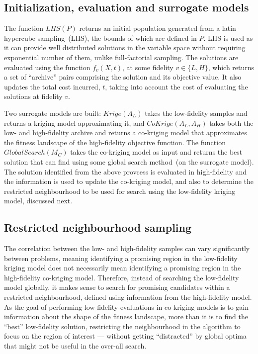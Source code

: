 \subsection{Initialization, evaluation and surrogate models}
The function $LHS(P)$ returns an initial population generated from a latin hypercube sampling~(LHS), the bounds of which are defined in $P$. LHS is used as it can provide well distributed solutions in the variable space without requiring exponential number of them, unlike full-factorial sampling. The solutions are evaluated using the function $f_v(X,t)$, at some fidelity $v\in \{L,H\}$, which returns a set of ``archive'' pairs comprising the solution and its objective value. It also updates the total cost incurred, $t$, taking into account the cost of evaluating the solutions at fidelity $v$. 

Two surrogate models are built: $Krige(A_L)$ takes the low-fidelity samples and returns a kriging model approximating it, and $CoKrige(A_L,A_H)$ takes both the low- and high-fidelity archive and returns a co-kriging model that approximates the fitness landscape of the high-fidelity objective function. The function $GlobalSearch(M_C)$ takes the co-kriging model as input and returns the best solution that can find using some global search method~(on the surrogate model). The solution identified from the above provcess is evaluated in high-fidelity and the information is used to update the co-kriging model, and also to determine the restricted neighbourhood to be used for search using the low-fidelity kriging model, discussed next.

\subsection{Restricted neighbourhood sampling}\label{subsec:restrict}
The correlation between the low- and high-fidelity samples can vary significantly between problems, meaning identifying a promising region in the low-fidelity kriging model does not necessarily mean identifying a promising region in the high-fidelity co-kriging model. Therefore, instead of searching the low-fidelity model globally, it makes sense to search for promising candidates within a restricted neighbourhood, defined using information from the high-fidelity model. As the goal of performing low-fidelity evaluations in co-kriging models is to gain information about the shape of the fitness landscape, more than it is to find the ``best'' low-fidelity solution, restricting the neighbourhood in the algorithm to focus on the region of interest --- without getting ``distracted'' by global optima that might not be useful in the over-all search.

